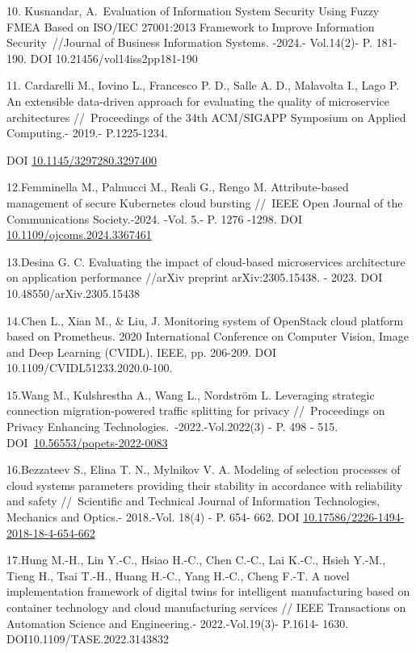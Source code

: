 {10. Kusnandar, A.~Evaluation of Information System Security Using Fuzzy
FMEA Based on ISO/IEC 27001:2013 Framework to Improve Information
Security~//Journal of Business Information Systems. -2024.- Vol.14(2)-
P. 181- 190. DOI 10.21456/vol14iss2pp181-190

11. Cardarelli M., Iovino L., Francesco P. D., Salle A. D., Malavolta
I., Lago P. An extensible data-driven approach for evaluating the
quality of microservice architectures //~Proceedings of the 34th
ACM/SIGAPP Symposium on Applied Computing.- 2019.- P.1225-1234.

DOI
\href{https://doi.org/10.1145/3297280.3297400}{10.1145/3297280.3297400}

12.Femminella M., Palmucci M., Reali G., Rengo M. Attribute-based
management of secure Kubernetes cloud bursting //~IEEE Open Journal of
the Communications Society.-2024. -Vol. 5.- P. 1276 -1298. DOI
\href{https://doi.org/10.1109/ojcoms.2024.3367461}{10.1109/ojcoms.2024.3367461}

13.Desina G. C. Evaluating the impact of cloud-based microservices
architecture on application performance //arXiv preprint
arXiv:2305.15438. - 2023. DOI 10.48550/arXiv.2305.15438

14.Chen L., Xian M., \& Liu, J. Monitoring system of OpenStack cloud
platform based on Prometheus. 2020 International Conference on Computer
Vision, Image and Deep Learning (CVIDL). IEEE, pp. 206-209. DOI
10.1109/CVIDL51233.2020.0-100.

15.Wang M., Kulshrestha A., Wang L., Nordström L. Leveraging strategic
connection migration-powered traffic splitting for privacy
//~Proceedings on Privacy Enhancing Technologies.~-2022.-Vol.2022(3) -
P. 498 - 515.
DOI~\href{https://doi.org/10.56553/popets-2022-0083}{10.56553/popets-2022-0083}

16.Bezzateev S., Elina T. N., Mylnikov V. A. Modeling of selection
processes of cloud systems parameters providing their stability in
accordance with reliability and safety //~Scientific and Technical
Journal of Information Technologies, Mechanics and Optics.- 2018.-Vol.
18(4) - P. 654- 662. DOI
\href{https://doi.org/10.17586/2226-1494-2018-18-4-654-662}{10.17586/2226-1494-2018-18-4-654-662}

17.Hung M.-H., Lin Y.-C., Hsiao H.-C., Chen C.-C., Lai K.-C., Hsieh
Y.-M., Tieng H., Tsai T.-H., Huang H.-C., Yang H.-C., Cheng F.-T. A
novel implementation framework of digital twins for intelligent
manufacturing based on container technology and cloud manufacturing
services // IEEE Transactions on Automation Science and Engineering.-
2022.-Vol.19(3)- P.1614- 1630. DOI10.1109/TASE.2022.3143832

}
